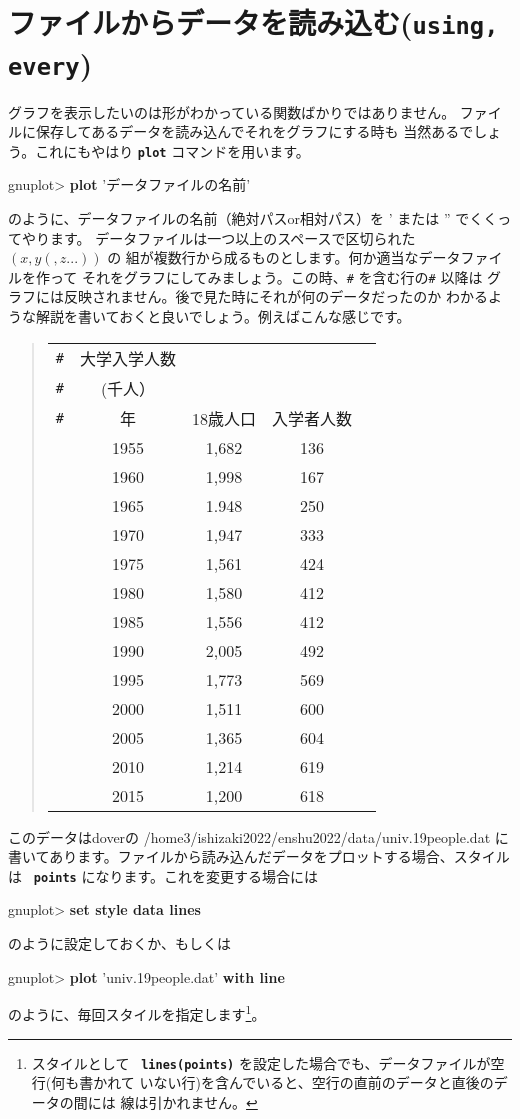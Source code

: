 \documentclass[a4j]{ujarticle} %
\newenvironment{terminal}{%
  \begin{center}
   \begin{minipage}{.8\textwidth}
    \setlength{\FrameSep}{.5\FrameSep}%
    \begin{framed}\ttfamily\small%
     \setlength\baselineskip{.85\baselineskip}%
}{%
    \end{framed}
   \end{minipage}
  \end{center}%
}
\begin{document}
\section{ファイルからデータを読み込む({\tt\bf using, every})}
グラフを表示したいのは形がわかっている関数ばかりではありません。
ファイルに保存してあるデータを読み込んでそれをグラフにする時も
当然あるでしょう。これにもやはり {\tt\bf plot} コマンドを用います。
\begin{terminal}
gnuplot> {\bf plot} 'データファイルの名前'
\end{terminal}
のように、データファイルの名前（絶対パスor相対パス）を ' または '' でくくってやります。
データファイルは一つ以上のスペースで区切られた $(x,y(,z...))$ の
組が複数行から成るものとします。何か適当なデータファイルを作って
それをグラフにしてみましょう。この時、{\tt \#} を含む行の{\tt \#} 以降は
グラフには反映されません。後で見た時にそれが何のデータだったのか
わかるような解説を書いておくと良いでしょう。例えばこんな感じです。
\begin{quote}
 \renewcommand{\arraystretch}{0.7}
\begin{tabular}{lcccc}
{\tt \#} & 大学入学人数 & & & \\
{\tt \#} & (千人） & & & \\
{\tt \#} & 年 & 18歳人口 & 入学者人数\\
&  1955 & 1,682 & 136 \\
&  1960 & 1,998 & 167 \\
&  1965 & 1.948 & 250 \\
&  1970 & 1,947 & 333 \\
&  1975 & 1,561 & 424 \\
&  1980 & 1,580 & 412 \\
&  1985 & 1,556 & 412 \\
&  1990 & 2,005 & 492 \\
&  1995 & 1,773 & 569 \\
&  2000 & 1,511 & 600 \\
&  2005 & 1,365 & 604 \\
&  2010 & 1,214 & 619 \\
&  2015 & 1,200 & 618 \\
\end{tabular}
\end{quote}

このデータはdoverの /home3/ishizaki2022/enshu2022/data/univ.19people.dat に書いてあります。ファイルから読み込んだデータをプロットする場合、スタイルは {\bf\tt
points} になります。これを変更する場合には
\begin{terminal}
gnuplot> {\bf set style data lines}
\end{terminal}
のように設定しておくか、もしくは
\begin{terminal}
gnuplot> {\bf plot} 'univ.19people.dat' {\bf with line}
\end{terminal}
のように、毎回スタイルを指定します\footnote{スタイルとして {\bf\tt
lines(points)} を設定した場合でも、データファイルが空行(何も書かれて
いない行)を含んでいると、空行の直前のデータと直後のデータの間には
線は引かれません。}。
\end{document}
